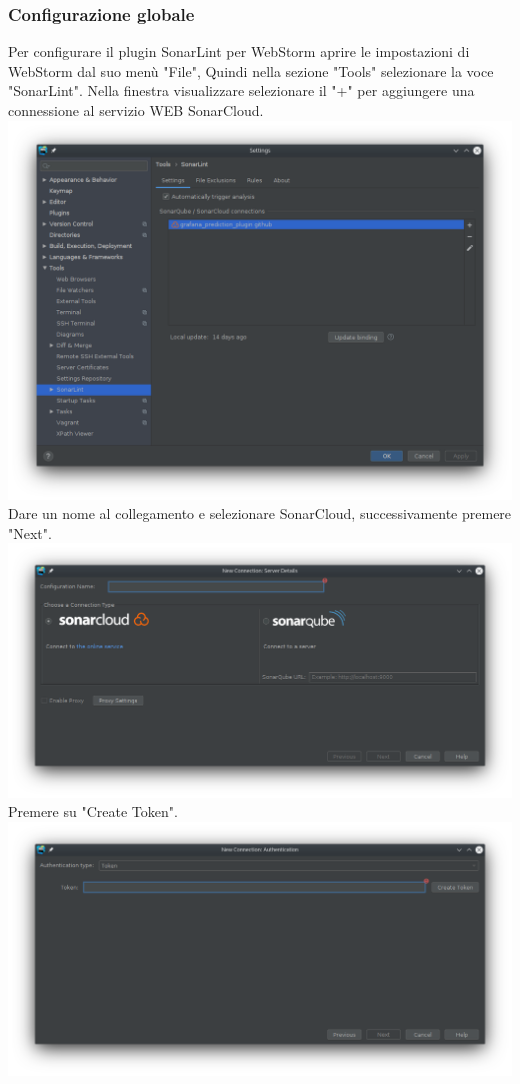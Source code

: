 \subsubsection{Configurazione globale}
Per configurare il plugin SonarLint per WebStorm aprire le impostazioni di WebStorm dal suo menù "File", Quindi nella sezione "Tools" selezionare la voce "SonarLint". Nella finestra visualizzare selezionare il "+" per aggiungere una connessione al servizio WEB SonarCloud.
\\
\includegraphics[width=\textwidth,height=\textheight,keepaspectratio]{img/connection.png}
Dare un nome al collegamento e selezionare SonarCloud, successivamente premere "Next".
\\
\includegraphics[width=\textwidth,height=\textheight,keepaspectratio]{img/connection-name.png}
Premere su "Create Token".
\\
\includegraphics[width=\textwidth,height=\textheight,keepaspectratio]{img/token.png}
